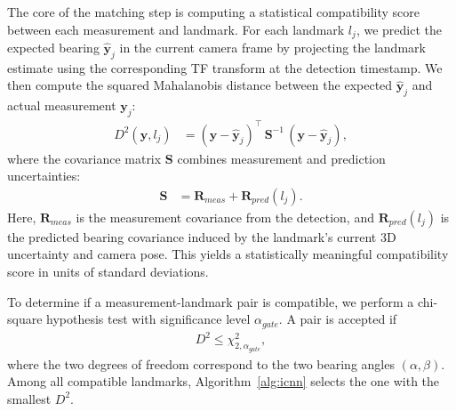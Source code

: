 \documentclass[
	parspace, %
	noindent, %
	final, %
]{elteikthesis}
\begin{document}
The core of the matching step is computing a statistical compatibility score between each measurement and landmark. For each landmark $l_j$, we predict the expected bearing $\hat{\mathbf{y}}_j$ in the current camera frame by projecting the landmark estimate using the corresponding TF transform at the detection timestamp. We then compute the squared Mahalanobis distance between the expected $\hat{\mathbf{y}}_j$ and actual measurement $\mathbf{y}_j$:
\begin{align}
D^2(\mathbf{y},l_j) &= (\mathbf{y}-\hat{\mathbf{y}}_j)^\top\, \mathbf{S}^{-1}\, (\mathbf{y}-\hat{\mathbf{y}}_j),
\end{align}
where the covariance matrix $\mathbf{S}$ combines measurement and prediction uncertainties:
\begin{align}
\mathbf{S} &= \mathbf{R}_{meas} + \mathbf{R}_{pred}(l_j).
\end{align}
Here, $\mathbf{R}_{meas}$ is the measurement covariance from the detection, and $\mathbf{R}_{pred}(l_j)$ is the predicted bearing covariance induced by the landmark's current 3D uncertainty and camera pose. This yields a statistically meaningful compatibility score in units of standard deviations.

To determine if a measurement-landmark pair is compatible, we perform a chi-square hypothesis test with significance level $\alpha_{gate}$. A pair is accepted if
\begin{align}
D^2 \leq \chi^2_{2,\alpha_{gate}},
\end{align}
where the two degrees of freedom correspond to the two bearing angles $(\alpha,\beta)$. Among all compatible landmarks, Algorithm~\ref{alg:icnn} selects the one with the smallest $D^2$.
\end{document}
